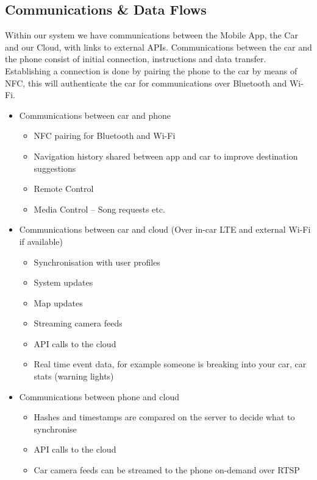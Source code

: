 \documentclass{article}
\begin{document}
\subsection{Communications \& Data Flows} \label{ssec:communications-data}
Within our system we have communications between the Mobile App, the Car and our Cloud, with links to external APIs.
\newline
Communications between the car and the phone consist of initial connection, instructions and data transfer. Establishing a connection is done by pairing the phone to the car by means of NFC, this will authenticate the car for communications over Bluetooth and Wi-Fi.
  	\begin{itemize}
      \item Communications between car and phone
      \begin{itemize}     
        	\item NFC pairing for Bluetooth and Wi-Fi
            \item Navigation history shared between app and car to improve destination suggestions
            \item Remote Control
            \item Media Control -- Song requests etc.
	  \end{itemize}
	  \item Communications between car and cloud (Over in-car LTE and external Wi-Fi if available)     	
        \begin{itemize}
          \item Synchronisation with user profiles
          \item System updates
          \item Map updates
          \item Streaming camera feeds
          \item API calls to the cloud
          \item Real time event data, for example someone is breaking into your car, car stats (warning lights)
        \end{itemize}
      \item Communications between phone and cloud      
        \begin{itemize}
        	\item Hashes and timestamps are compared on the server to decide what to synchronise
            \item API calls to the cloud
            \item Car camera feeds can be streamed to the phone on-demand over RTSP

\end{itemize}
\end{itemize}
\end{document}
